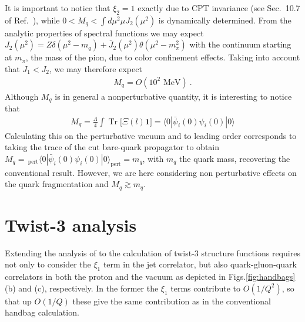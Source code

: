 \documentclass[preprintnumbers,floatfix,nofootinbib]{revtex4}
\newcommand{\todo}[1]{\marginpar{$\bullet$}\textbf{#1}}
\newcommand{\Tr}{\operatorname*{Tr}\nolimits} %
\newcommand{\mj}{M_q}
\newcommand{\mq}{m_q}
\begin{document}
It is important to notice that $\xi_2=1$ exactly due to CPT invariance
(see Sec.~10.7 of Ref.~\cite{Weinberg:1995mt}), while $0 < \mj < \int d\mu^2 \mu J_2(\mu^2)$ is
dynamically determined. From the analytic properties of spectral functions we
may expect \cite{Accardi:2008ne} $J_2(\mu^2) = Z \delta(\mu^2-m_q) + \bar J_2
(\mu^2) \theta (\mu^2-m_\pi^2)$ with the continuum starting at $m_\pi$, the
mass of the pion, due to color confinement effects. Taking into account that
$J_1 < J_2$, we may therefore expect  
\begin{align}
  \label{eq:mjet}
  \mj = O(10^2 \text{ MeV}) \ .
\end{align}
Although $\mj$ is in general a nonperturbative quantity, it is interesting to
notice that  
\begin{align}
  \label{eq:xi2_chiral_cond}
  \mj = \frac{\Lambda}{4} \int \Tr \big[ \Xi(l) \bm 1] 
   = \langle 0 | \bar \psi_i(0) \psi_i(0) | 0 \rangle
\end{align}
Calculating this on the perturbative vacuum and to leading order
corresponds to taking the trace of the cut bare-quark propagator to obtain 
$\mj = \,_{\text{pert}} \langle 0
|  \bar \psi_i(0) \psi_i(0) | 0 \rangle_{\text{pert}}  = \mq$, with $\mq$ the quark mass, recovering the
conventional result. However, we are here considering non perturbative effects
on the quark fragmentation and $\mj \gtrsim \mq$. 

\section{Twist-3 analysis}

Extending the analysis of \cite{Accardi:2008ne} to the calculation of twist-3
structure functions requires not only to consider the $\xi_1$ term in the jet
correlator, but also quark-gluon-quark correlators in both the proton and the
vacuum as depicted in Figs.\ref{fig:handbags}(b) and (c), respectively. 
In the former the $\xi_1$ terms contribute to $O(1/Q^2)$, so that up $O(1/Q)$
these give the same contribution as in the conventional handbag calculation.  
\end{document}
